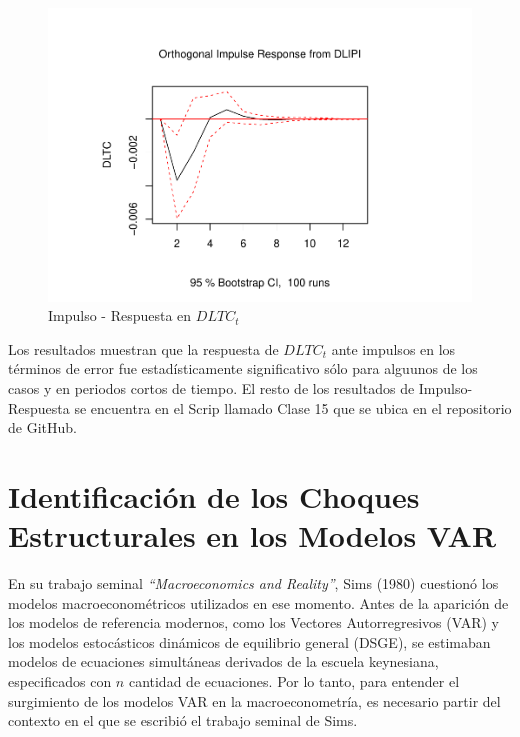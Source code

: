 \documentclass[
]{book}
\begin{document}
\begin{figure}

{\centering \includegraphics{Notas-Series-Tiempo_files/figure-latex/fig64-5} 

}

\caption{Impulso - Respuesta en $DLTC_t$}\label{fig:fig64-5}
\end{figure}

Los resultados muestran que la respuesta de \(DLTC_t\) ante impulsos en
los términos de error fue estadísticamente significativo sólo para
alguunos de los casos y en periodos cortos de tiempo. El resto de los
resultados de Impulso-Respuesta se encuentra en el Scrip llamado Clase
15 que se ubica en el repositorio de GitHub.

\hypertarget{identificaciuxf3n-de-los-choques-estructurales-en-los-modelos-var}{%
\section{Identificación de los Choques Estructurales en los Modelos VAR}\label{identificaciuxf3n-de-los-choques-estructurales-en-los-modelos-var}}

En su trabajo seminal \emph{``Macroeconomics and Reality''}, Sims (1980)
cuestionó los modelos macroeconométricos utilizados en ese momento.
Antes de la aparición de los modelos de referencia modernos, como los
Vectores Autorregresivos (VAR) y los modelos estocásticos dinámicos de
equilibrio general (DSGE), se estimaban modelos de ecuaciones
simultáneas derivados de la escuela keynesiana, especificados con \(n\) cantidad de ecuaciones. Por lo tanto, para entender el surgimiento de los modelos
VAR en la macroeconometría, es necesario partir del contexto en el que
se escribió el trabajo seminal de Sims.
\end{document}
